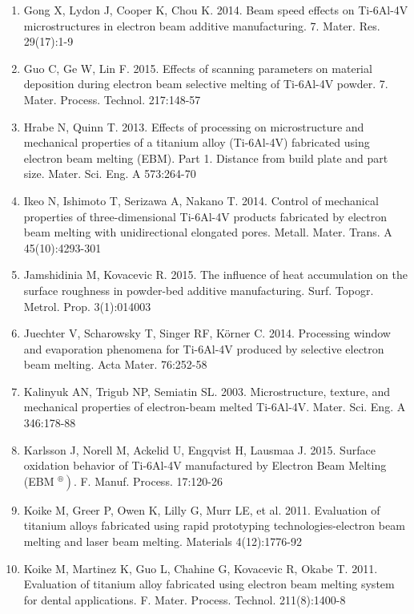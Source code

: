 \documentclass[10pt]{article}
\begin{document}
\begin{enumerate}
  \item Gong X, Lydon J, Cooper K, Chou K. 2014. Beam speed effects on Ti-6Al-4V microstructures in electron beam additive manufacturing. 7. Mater. Res. 29(17):1-9

  \item Guo C, Ge W, Lin F. 2015. Effects of scanning parameters on material deposition during electron beam selective melting of Ti-6Al-4V powder. 7. Mater. Process. Technol. 217:148-57

  \item Hrabe N, Quinn T. 2013. Effects of processing on microstructure and mechanical properties of a titanium alloy (Ti-6Al-4V) fabricated using electron beam melting (EBM). Part 1. Distance from build plate and part size. Mater. Sci. Eng. A 573:264-70

  \item Ikeo N, Ishimoto T, Serizawa A, Nakano T. 2014. Control of mechanical properties of three-dimensional Ti-6Al-4V products fabricated by electron beam melting with unidirectional elongated pores. Metall. Mater. Trans. A 45(10):4293-301

  \item Jamshidinia M, Kovacevic R. 2015. The influence of heat accumulation on the surface roughness in powder-bed additive manufacturing. Surf. Topogr. Metrol. Prop. 3(1):014003

  \item Juechter V, Scharowsky T, Singer RF, Körner C. 2014. Processing window and evaporation phenomena for Ti-6Al-4V produced by selective electron beam melting. Acta Mater. 76:252-58

  \item Kalinyuk AN, Trigub NP, Semiatin SL. 2003. Microstructure, texture, and mechanical properties of electron-beam melted Ti-6Al-4V. Mater. Sci. Eng. A 346:178-88

  \item Karlsson J, Norell M, Ackelid U, Engqvist H, Lausmaa J. 2015. Surface oxidation behavior of Ti-6Al-4V manufactured by Electron Beam Melting (EBM $\left.{ }^{\circledR}\right)$. F. Manuf. Process. 17:120-26

  \item Koike M, Greer P, Owen K, Lilly G, Murr LE, et al. 2011. Evaluation of titanium alloys fabricated using rapid prototyping technologies-electron beam melting and laser beam melting. Materials 4(12):1776-92

  \item Koike M, Martinez K, Guo L, Chahine G, Kovacevic R, Okabe T. 2011. Evaluation of titanium alloy fabricated using electron beam melting system for dental applications. F. Mater. Process. Technol. 211(8):1400-8


\end{enumerate}
\end{document}
